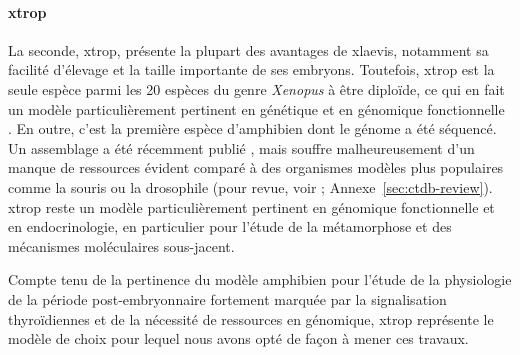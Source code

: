 \documentclass[../main.tex]{subfiles}
\begin{document}
\paragraph{\gls{xtrop}}
La seconde, \gls{xtrop}, présente la plupart des avantages de \gls{xlaevis}, notamment sa facilité d'élevage et la taille importante de ses embryons.
Toutefois, \gls{xtrop} est la seule espèce parmi les 20 espèces du genre \textit{Xenopus} à être diploïde, ce qui en fait un modèle particulièrement pertinent en génétique et en génomique fonctionnelle \citep{Amaya2005}.
En outre, c'est la première espèce d'amphibien dont le génome a été séquencé.
Un assemblage a été récemment publié \citep{Hellsten2010a}, mais souffre malheureusement d'un manque de ressources évident comparé à des organismes modèles plus populaires comme la souris ou la drosophile (pour revue, voir \citet{Grimaldi2013}; Annexe~\ref{sec:ctdb-review}).
\gls{xtrop} reste un modèle particulièrement pertinent en génomique fonctionnelle et en endocrinologie, en particulier pour l'étude de la métamorphose et des mécanismes moléculaires sous-jacent.
\par
Compte tenu de la pertinence du modèle amphibien pour l'étude de la physiologie de la période post-embryonnaire fortement marquée par la signalisation thyroïdiennes et de la nécessité de ressources en génomique, \gls{xtrop} représente le modèle de choix pour lequel nous avons opté de façon à mener ces travaux.

\end{document}
